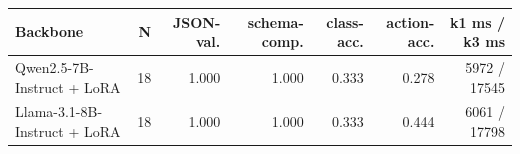 \begin{tabular}{lrrrrrr}
\toprule
Backbone & N & JSON-val. & schema-comp. & class-acc. & action-acc. & k1 ms / k3 ms \\
\midrule
Qwen2.5-7B-Instruct + LoRA & 18 & 1.000 & 1.000 & 0.333 & 0.278 & 5972 / 17545 \\
Llama-3.1-8B-Instruct + LoRA & 18 & 1.000 & 1.000 & 0.333 & 0.444 & 6061 / 17798 \\
\bottomrule
\end{tabular}
